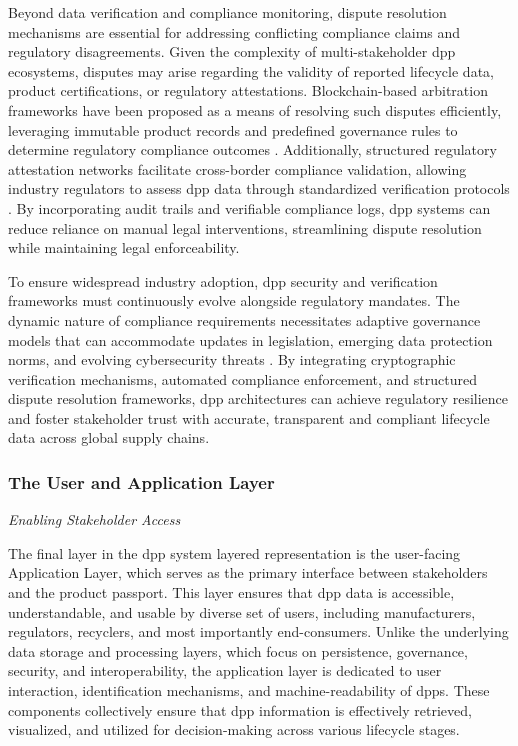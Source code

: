 Beyond data verification and compliance monitoring, dispute resolution mechanisms are essential for addressing conflicting compliance claims and regulatory disagreements. Given the complexity of multi-stakeholder \ac{dpp} ecosystems, disputes may arise regarding the validity of reported lifecycle data, product certifications, or regulatory attestations. Blockchain-based arbitration frameworks have been proposed as a means of resolving such disputes efficiently, leveraging immutable product records and predefined governance rules to determine regulatory compliance outcomes \autocite{Jensen.2024}. Additionally, structured regulatory attestation networks facilitate cross-border compliance validation, allowing industry regulators to assess \ac{dpp} data through standardized verification protocols \autocite{Pietron.2023}. By incorporating audit trails and verifiable compliance logs, \ac{dpp} systems can reduce reliance on manual legal interventions, streamlining dispute resolution while maintaining legal enforceability.

To ensure widespread industry adoption, \ac{dpp} security and verification frameworks must continuously evolve alongside regulatory mandates. The dynamic nature of compliance requirements necessitates adaptive governance models that can accommodate updates in legislation, emerging data protection norms, and evolving cybersecurity threats \autocite{Ducuing.2023}. By integrating cryptographic verification mechanisms, automated compliance enforcement, and structured dispute resolution frameworks, \ac{dpp} architectures can achieve regulatory resilience and foster stakeholder trust with accurate, transparent and compliant lifecycle data across global supply chains.

\subsubsection{The User and Application Layer}
\textit{Enabling Stakeholder Access}

The final layer in the \ac{dpp} system layered representation is the user-facing Application Layer, which serves as the primary interface between stakeholders and the product passport. This layer ensures that \ac{dpp} data is accessible, understandable, and usable by diverse set of users, including manufacturers, regulators, recyclers, and most importantly end-consumers. Unlike the underlying data storage and processing layers, which focus on persistence, governance, security, and interoperability, the application layer is dedicated to user interaction, identification mechanisms, and machine-readability of \ac{dpp}s. \autocite{EuropeanParliamentandCouncil.2024} These components collectively ensure that \ac{dpp} information is effectively retrieved, visualized, and utilized for decision-making across various lifecycle stages.

